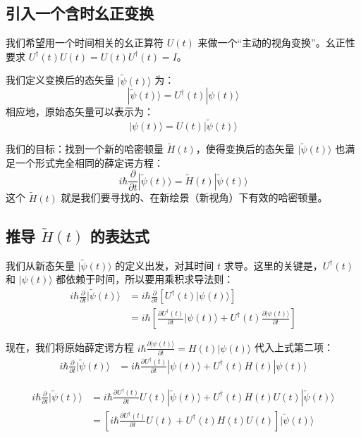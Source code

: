 \subsection{引入一个含时幺正变换}

我们希望用一个时间相关的幺正算符 \(U(t)\) 来做一个“主动的视角变换”。幺正性要求 \(U^{\dagger}(t)U(t) = U(t)U^{\dagger}(t) = I\)。

我们定义变换后的态矢量 \(|\tilde{\psi}(t)\rangle\) 为：
\[
|\tilde{\psi}(t)\rangle = U^{\dagger}(t) |\psi(t)\rangle
\]
相应地，原始态矢量可以表示为：
\[
|\psi(t)\rangle = U(t) |\tilde{\psi}(t)\rangle
\]

我们的目标：找到一个新的哈密顿量 \(\tilde{H}(t)\)，使得变换后的态矢量 \(|\tilde{\psi}(t)\rangle\) 也满足一个形式完全相同的薛定谔方程：
\[
i\hbar \frac{\partial}{\partial t} |\tilde{\psi}(t)\rangle = \tilde{H}(t) |\tilde{\psi}(t)\rangle
\]
这个 \(\tilde{H}(t)\) 就是我们要寻找的、在新绘景（新视角）下有效的哈密顿量。

\subsection*{ 推导 \(\tilde{H}(t)\) 的表达式}

我们从新态矢量 \(|\tilde{\psi}(t)\rangle\) 的定义出发，对其时间 \(t\) 求导。这里的关键是，\(U^{\dagger}(t)\) 和 \(|\psi(t)\rangle\) 都依赖于时间，所以要用乘积求导法则：
\[
\begin{aligned}
	i\hbar \frac{\partial}{\partial t} |\tilde{\psi}(t)\rangle &= i\hbar \frac{\partial}{\partial t} \left[ U^{\dagger}(t) |\psi(t)\rangle \right] \\
	&= i\hbar \left[ \frac{\partial U^{\dagger}(t)}{\partial t} |\psi(t)\rangle + U^{\dagger}(t) \frac{\partial |\psi(t)\rangle}{\partial t} \right]
\end{aligned}
\]

现在，我们将原始薛定谔方程 \(i\hbar \frac{\partial |\psi(t)\rangle}{\partial t} = H(t) |\psi(t)\rangle\) 代入上式第二项：
\[
\begin{aligned}
	i\hbar \frac{\partial}{\partial t} |\tilde{\psi}(t)\rangle &= i\hbar \frac{\partial U^{\dagger}(t)}{\partial t} |\psi(t)\rangle + U^{\dagger}(t) H(t) |\psi(t)\rangle
\end{aligned}
\]


\[
\begin{aligned}
	i\hbar \frac{\partial}{\partial t} |\tilde{\psi}(t)\rangle &= i\hbar \frac{\partial U^{\dagger}(t)}{\partial t} U(t) |\tilde{\psi}(t)\rangle + U^{\dagger}(t) H(t) U(t) |\tilde{\psi}(t)\rangle \\
	&= \left[ i\hbar \frac{\partial U^{\dagger}(t)}{\partial t} U(t) + U^{\dagger}(t) H(t) U(t) \right] |\tilde{\psi}(t)\rangle
\end{aligned}
\]

